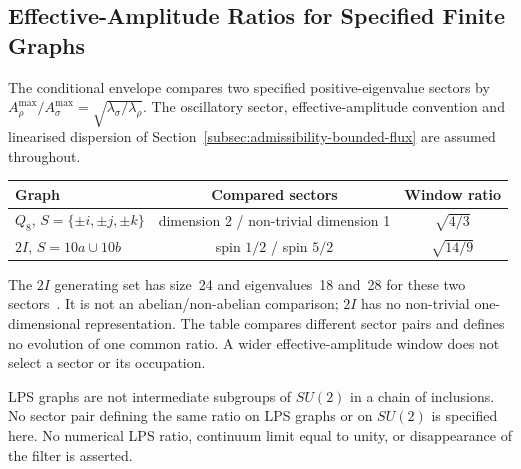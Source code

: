 \subsection{Effective-Amplitude Ratios for Specified Finite Graphs}
  \label{subsec:Rp-along-chain}

  The conditional envelope compares two specified positive-eigenvalue sectors by
  $A_\rho^{\max}/A_\sigma^{\max}=\sqrt{\lambda_\sigma/\lambda_\rho}$.
  The oscillatory sector, effective-amplitude convention and linearised dispersion of
  Section~\ref{subsec:admissibility-bounded-flux} are assumed throughout.

  \begin{center}
    \begin{tabular}{lcc}
      \hline
      Graph & Compared sectors & Window ratio \\
      \hline
      $Q_8$, $S=\{\pm i,\pm j,\pm k\}$ & dimension 2 / non-trivial dimension 1 & $\sqrt{4/3}$ \\
      $2I$, $S=10a\cup10b$ & spin $1/2$ / spin $5/2$ & $\sqrt{14/9}$ \\
      \hline
    \end{tabular}
  \end{center}

  The $2I$ generating set has size~24 and eigenvalues~18 and~28 for these two
  sectors~\cite{Beau2026a1}.
  It is not an abelian/non-abelian comparison; $2I$ has no non-trivial one-dimensional representation.
  The table compares different sector pairs and defines no evolution of one common ratio.
  A wider effective-amplitude window does not select a sector or its occupation.

  LPS graphs are not intermediate subgroups of $SU(2)$ in a chain of inclusions.
  No sector pair defining the same ratio on LPS graphs or on $SU(2)$ is specified here.
  No numerical LPS ratio, continuum limit equal to unity, or disappearance of the filter is asserted.
